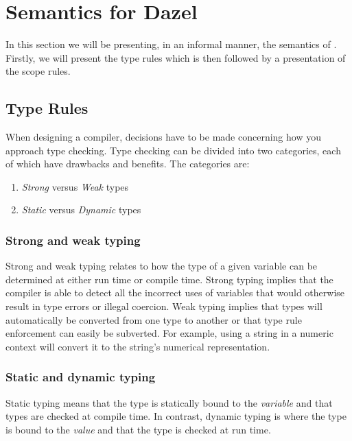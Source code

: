 \section{Semantics for Dazel} \label{sec:semantics}

In this section we will be presenting, in an informal manner, the semantics of \dazel{}.
Firstly, we will present the type rules which is then followed by a presentation of the scope rules.

\subsection{Type Rules}

When designing a compiler, decisions have to be made concerning how you approach type checking.
Type checking can be divided into two categories, each of which have drawbacks and benefits. The categories are:

\begin{enumerate}
    \item \textit{Strong} versus \textit{Weak} types
    \item \textit{Static} versus \textit{Dynamic} types
\end{enumerate}

\subsubsection*{Strong and weak typing}
Strong and weak typing relates to how the type of a given variable can be determined at either run time or compile time.
Strong typing implies that the compiler is able to detect all the incorrect uses of variables that would otherwise result in type errors or illegal coercion.
Weak typing implies that types will automatically be converted from one type to another or that type rule enforcement can easily be subverted.
For example, using a string in a numeric context will convert it to the string's numerical representation\cite{sebesta_concepts_2016}.

\subsubsection*{Static and dynamic typing}
Static typing means that the type is statically bound to the \emph{variable} and that types are checked at compile time.
In contrast, dynamic typing is where the type is bound to the \emph{value} and that the type is checked at run time\cite{sebesta_concepts_2016}.

